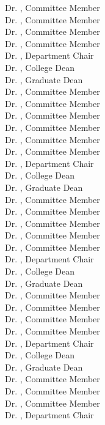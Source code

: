 \begin{titlepage}
Dr. \commemd, Committee Member\\
Dr. \commeme, Committee Member\\
Dr. \commemf, Committee Member\\
Dr. \commemg, Committee Member\\
Dr. \depchair, Department Chair\\
Dr. \colldean, College Dean\\
Dr. \graddean, Graduate Dean\\
\else
\ifdefined\commemf
\noindent
Dr. \commema, Committee Member\\
Dr. \commemb, Committee Member\\
Dr. \commemc, Committee Member\\
Dr. \commemd, Committee Member\\
Dr. \commeme, Committee Member\\
Dr. \commemf, Committee Member\\
Dr. \depchair, Department Chair\\
Dr. \colldean, College Dean\\
Dr. \graddean, Graduate Dean\\
\else
\ifdefined\commeme
Dr. \commema, Committee Member\\
Dr. \commemb, Committee Member\\
Dr. \commemc, Committee Member\\
Dr. \commemd, Committee Member\\
Dr. \commeme, Committee Member\\
Dr. \depchair, Department Chair\\
Dr. \colldean, College Dean\\
Dr. \graddean, Graduate Dean\\
\else
\ifdefined\commemd
Dr. \commema, Committee Member\\
Dr. \commemb, Committee Member\\
Dr. \commemc, Committee Member\\
Dr. \commemd, Committee Member\\
Dr. \depchair, Department Chair\\
Dr. \colldean, College Dean\\
Dr. \graddean, Graduate Dean\\
\else
\ifdefined\commemc
Dr. \commema, Committee Member\\
Dr. \commemb, Committee Member\\
Dr. \commemc, Committee Member\\
Dr. \depchair, Department Chair\\

\end{titlepage}
